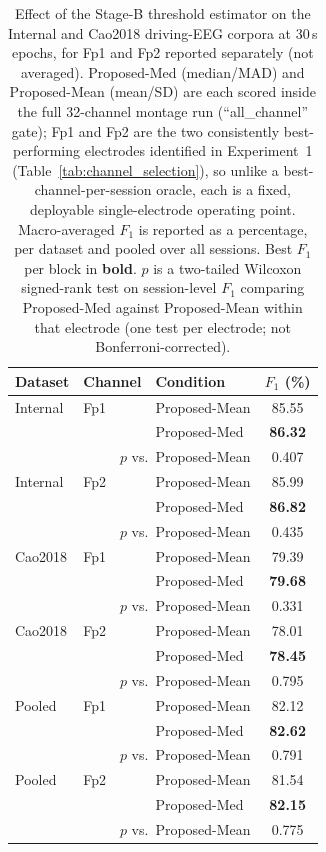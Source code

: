 \begin{table}[ht]
  \centering
  \caption{Effect of the Stage-B threshold estimator on the Internal and Cao2018 driving-EEG corpora at 30\,s epochs, for Fp1 and Fp2 reported separately (not averaged). Proposed-Med (median/MAD) and Proposed-Mean (mean/SD) are each scored inside the full 32-channel montage run (``all\_channel'' gate); Fp1 and Fp2 are the two consistently best-performing electrodes identified in Experiment~1 (Table~\ref{tab:channel_selection}), so unlike a best-channel-per-session oracle, each is a fixed, deployable single-electrode operating point. Macro-averaged $F_1$ is reported as a percentage, per dataset and pooled over all sessions. Best $F_1$ per block in \textbf{bold}. $p$ is a two-tailed Wilcoxon signed-rank test on session-level $F_1$ comparing Proposed-Med against Proposed-Mean within that electrode (one test per electrode; not Bonferroni-corrected).}
  \label{tab:exp3_estimator}
  \begin{tabular}{lllc}
    \toprule
    Dataset & Channel & Condition & $F_1$ (\%) \\
    \midrule
    Internal & Fp1 & Proposed-Mean & 85.55 \\
     &  & Proposed-Med & \textbf{86.32} \\
    \multicolumn{3}{r}{$p$ vs.\ Proposed-Mean} & 0.407 \\
    \midrule
    Internal & Fp2 & Proposed-Mean & 85.99 \\
     &  & Proposed-Med & \textbf{86.82} \\
    \multicolumn{3}{r}{$p$ vs.\ Proposed-Mean} & 0.435 \\
    \midrule
    Cao2018 & Fp1 & Proposed-Mean & 79.39 \\
     &  & Proposed-Med & \textbf{79.68} \\
    \multicolumn{3}{r}{$p$ vs.\ Proposed-Mean} & 0.331 \\
    \midrule
    Cao2018 & Fp2 & Proposed-Mean & 78.01 \\
     &  & Proposed-Med & \textbf{78.45} \\
    \multicolumn{3}{r}{$p$ vs.\ Proposed-Mean} & 0.795 \\
    \midrule
    Pooled & Fp1 & Proposed-Mean & 82.12 \\
     &  & Proposed-Med & \textbf{82.62} \\
    \multicolumn{3}{r}{$p$ vs.\ Proposed-Mean} & 0.791 \\
    \midrule
    Pooled & Fp2 & Proposed-Mean & 81.54 \\
     &  & Proposed-Med & \textbf{82.15} \\
    \multicolumn{3}{r}{$p$ vs.\ Proposed-Mean} & 0.775 \\
    \bottomrule
  \end{tabular}
\end{table}

